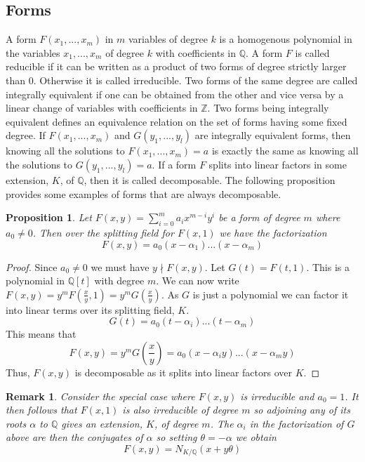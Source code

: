 \documentclass{article}
\newtheorem{proposition}{Proposition}[section]
\newtheorem{remark}{Remark}[section]
\newcommand{\mbb}[1]{\mathbb{#1}}
\numberwithin{equation}{section}
\begin{document}
\subsection{Forms}
A form $F(x_1, ..., x_m)$ in $m$ variables of degree $k$ is a homogenous polynomial in the variables $x_1, ..., x_m$ of degree $k$ with coefficients in $\mbb{Q}$. A form $F$ is called reducible if it can be written as a product of two forms of degree strictly larger than 0. Otherwise it is called irreducible. Two forms of the same degree are called integrally equivalent if one can be obtained from the other and vice versa by a linear change of variables with coefficients in $\mbb{Z}$. Two forms being integrally equivalent defines an equivalence relation on the set of forms having some fixed degree. If $F(x_1, ..., x_m)$ and $G(y_1, ..., y_l)$ are integrally equivalent forms, then knowing all the solutions to $F(x_1, ..., x_m) = a$ is exactly the same as knowing all the solutions to $G(y_1, ..., y_l) = a$. If a form $F$ splits into linear factors in some extension, $K$, of $\mbb{Q}$, then it is called decomposable.
The following proposition provides some examples of forms that are always decomposable.

\begin{proposition}\label{prop: Forms of two variables are decomposable}
    Let $F(x,y) = \sum_{i=0}^m a_i x^{m-i}y^{i}$ be a form of degree $m$ where $a_0 \neq 0$. Then over the splitting field for $F(x,1)$ we have the factorization
    $$F(x, y) = a_0(x - \alpha_1)...(x - \alpha_m)$$
\end{proposition}
\begin{proof}
    Since $a_0 \neq 0$ we must have $y \nmid F(x, y)$. Let $G(t) = F(t, 1)$. This is a polynomial in $\mbb Q[t]$ with degree $m$. We can now write
    $F(x, y) = y^mF(\frac{x}{y}, 1) = y^m G(\frac{x}{y})$. As $G$ is just a polynomial we can factor it into linear terms over its splitting field, $K$.
    $$G(t) = a_0 (t - \alpha_i) ... (t - \alpha_m)$$
    This means that
    $$F(x,y) = y^mG(\frac{x}{y}) =  a_0 (x - \alpha_iy) ... (x - \alpha_m y)$$
    Thus, $F(x,y)$ is decomposable as it splits into linear factors over $K$.
\end{proof}
\begin{remark}\label{remark: Forms of two variables are decomposable}
    Consider the special case where $F(x,y)$ is irreducible and $a_0 = 1$. It then follows that $F(x,1)$ is also irreducible of degree $m$ so adjoining any of its roots $\alpha$ to $\mbb Q$ gives an extension, $K$, of degree $m$. The $\alpha_i$ in the factorization of $G$ above are then the conjugates of $\alpha$ so setting $\theta = -\alpha$ we obtain
    $$F(x,y) = N_{K / \mbb Q}(x + y \theta)$$
\end{remark}
\end{document}
